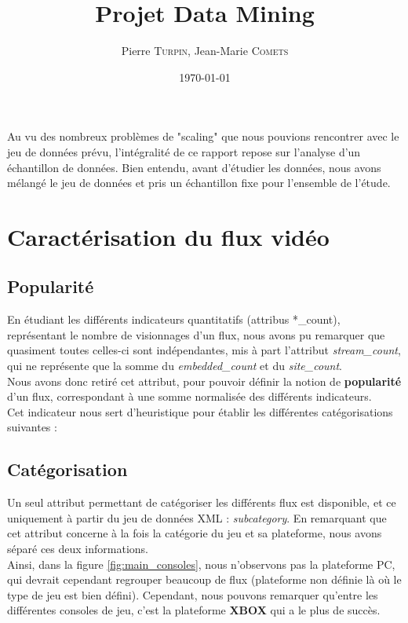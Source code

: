 \documentclass[11pt, a4paper, titlepage]{scrartcl}
\title{Projet Data Mining}
\author{Pierre \textsc{Turpin}, Jean-Marie \textsc{Comets}}
\date{\today}
\begin{document}
\maketitle
\tableofcontents
\newpage

Au vu des nombreux problèmes de "scaling" que nous pouvions rencontrer
avec le jeu de données prévu, l'intégralité de ce rapport repose sur
l'analyse d'un échantillon de données. Bien entendu, avant d'étudier les
données, nous avons mélangé le jeu de données et pris un échantillon fixe pour
l'ensemble de l'étude.

\section{Caractérisation du flux vidéo}

\subsection{Popularité}

En étudiant les différents indicateurs quantitatifs (attribus *\_count),
représentant le nombre de visionnages d'un flux, nous avons pu remarquer que
quasiment toutes celles-ci sont indépendantes, mis à part l'attribut
\textit{stream\_count}, qui ne représente que la somme du
\textit{embedded\_count} et du \textit{site\_count}. \\

Nous avons donc retiré cet attribut, pour pouvoir définir la notion de
\textbf{popularité} d'un flux, correspondant à une somme normalisée des
différents indicateurs. \\

Cet indicateur nous sert d'heuristique pour établir les différentes
catégorisations suivantes :

\subsection{Catégorisation}

Un seul attribut permettant de catégoriser les différents flux est disponible,
et ce uniquement à partir du jeu de données XML : \textit{subcategory}. En
remarquant que cet attribut concerne à la fois la catégorie du jeu et sa
plateforme, nous avons séparé ces deux informations. \\

Ainsi, dans la figure \ref{fig:main_consoles}, nous n'observons pas la
plateforme PC, qui devrait cependant regrouper beaucoup de flux (plateforme non
définie là où le type de jeu est bien défini). Cependant, nous pouvons
remarquer qu'entre les différentes consoles de jeu, c'est la plateforme \textbf{XBOX}
qui a le plus de succès. \\
\end{document}
